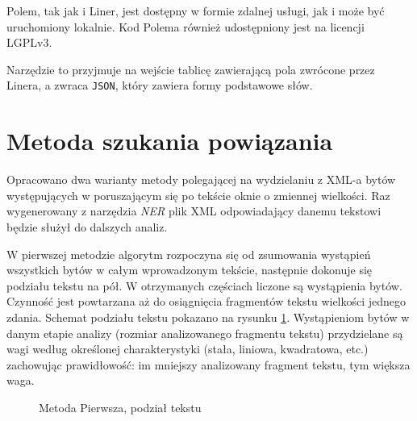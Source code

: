 \documentclass[12pt,a4paper]{article} %
\begin{document}
Polem, tak jak i Liner, jest dostępny w formie zdalnej usługi, jak i może być uruchomiony lokalnie. Kod Polema również udostępniony jest na licencji LGPLv3.

Narzędzie to przyjmuje na wejście tablicę zawierającą pola zwrócone przez Linera, a zwraca \texttt{JSON}, który zawiera formy podstawowe słów.

\newpage
\section{Metoda szukania powiązania}
Opracowano dwa warianty metody polegającej na wydzielaniu z XML-a bytów występujących w poruszającym się po tekście oknie o zmiennej wielkości. Raz wygenerowany z narzędzia \textit{NER} plik XML odpowiadający danemu tekstowi będzie służył do dalszych analiz.

W pierwszej metodzie algorytm rozpoczyna się od zsumowania wystąpień wszystkich bytów w całym wprowadzonym tekście, następnie dokonuje się podziału tekstu na pół. W otrzymanych częściach liczone są wystąpienia bytów. Czynność jest powtarzana aż do osiągnięcia fragmentów tekstu wielkości jednego zdania. Schemat podziału tekstu pokazano na rysunku \ref{fig:polowy}. Wystąpieniom bytów w danym etapie analizy (rozmiar analizowanego fragmentu tekstu) przydzielane są wagi według określonej charakterystyki (stała, liniowa, kwadratowa, etc.) zachowując prawidłowość: im mniejszy analizowany fragment tekstu, tym większa waga.
\begin{figure}[!h]
\caption{Metoda Pierwsza, podział tekstu}
\label{fig:polowy}
\centering
\end{figure}
\end{document}
